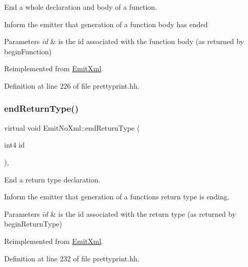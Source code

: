 End a whole declaration and body of a function. 

Inform the emitter that generation of a function body has ended 
\begin{DoxyParams}{Parameters}
{\em id} & is the id associated with the function body (as returned by begin\+Function) \\
\hline
\end{DoxyParams}


Reimplemented from \mbox{\hyperlink{class_emit_xml_ac1cfefc98a7cfbfa0c479cac8a1e2a71}{Emit\+Xml}}.



Definition at line 226 of file prettyprint.\+hh.

\mbox{\label{class_emit_no_xml_a6183514c884bc929fbcde10449db6096}} 
\subsubsection{\texorpdfstring{endReturnType()}{endReturnType()}}
{\footnotesize\ttfamily virtual void Emit\+No\+Xml\+::end\+Return\+Type (\begin{DoxyParamCaption}\item[{int4}]{id }\end{DoxyParamCaption})\hspace{0.3cm}{\ttfamily [inline]}, {\ttfamily [virtual]}}



End a return type declaration. 

Inform the emitter that generation of a function\textquotesingle{}s return type is ending. 
\begin{DoxyParams}{Parameters}
{\em id} & is the id associated with the return type (as returned by begin\+Return\+Type) \\
\hline
\end{DoxyParams}


Reimplemented from \mbox{\hyperlink{class_emit_xml_af7f778b3b2111e793d6ffd73017209f9}{Emit\+Xml}}.



Definition at line 232 of file prettyprint.\+hh.

\mbox{\label{class_emit_no_xml_a8b7a4a5484ac357c962cb427c760def6}} 

